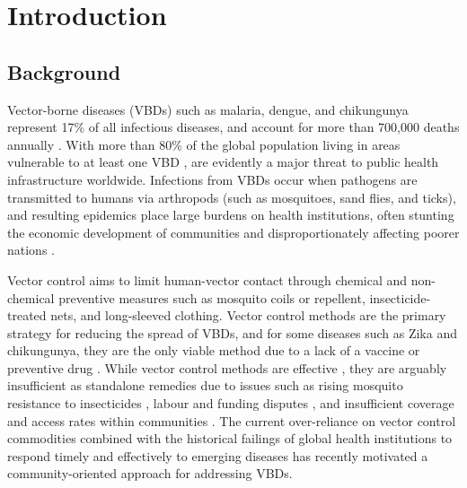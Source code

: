 \section{Introduction}

\subsection{Background}

Vector-borne diseases (VBDs) such as malaria, dengue, and chikungunya represent 17\% of all infectious diseases, and account for more than 700,000 deaths annually \cite{world_health_organisation_who_vector-borne_2020}. With more than 80\% of the global population living in areas vulnerable to at least one VBD \cite{golding_integrating_2015},  are evidently a major threat to public health infrastructure worldwide. Infections from VBDs occur when pathogens are transmitted to humans via arthropods (such as mosquitoes, sand flies, and ticks), and resulting epidemics place large burdens on health institutions, often stunting the economic development of communities and disproportionately affecting poorer nations \cite{lum_cost_2009, degroote_interventions_2018}.

Vector control aims to limit human-vector contact through chemical and non-chemical preventive measures such as mosquito coils or repellent, insecticide-treated nets, and long-sleeved clothing. Vector control methods are the primary strategy for reducing the spread of VBDs, and for some diseases such as Zika and chikungunya, they are the only viable method due to a lack of a vaccine or preventive drug \cite{wilson_importance_2020}. While vector control methods are effective \cite{wilson_importance_2020, chala_emerging_2021}, they are arguably insufficient as standalone remedies due to issues such as rising mosquito resistance to insecticides \cite{hemingway_averting_2016}, labour and funding disputes \cite{winch_effectiveness_1992}, and insufficient coverage and access rates within communities \cite{okumu_what_2022}. The current over-reliance on vector control commodities combined with the historical failings of global health institutions to respond timely and effectively to emerging diseases \cite{bardosh_addressing_2017} has recently motivated a community-oriented approach for addressing VBDs.


